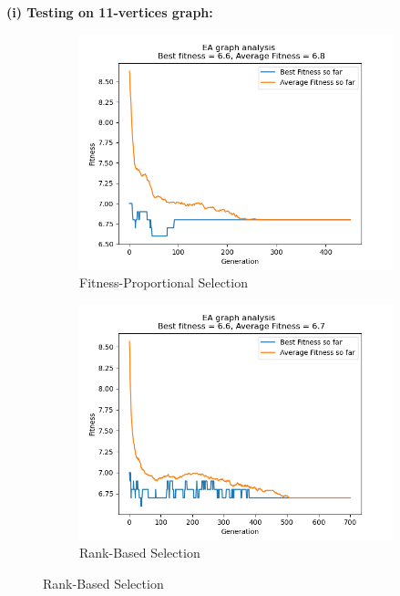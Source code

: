 \documentclass[conference,compsoc]{IEEEtran}
\begin{document}
\begin{center}
  \textbf{(i) Testing on 11-vertices graph:}
\end{center}
\setlength{\parskip}{0 em}
\begin{figure}[h]
  \vspace{-1 em}
  \centering 
  \begin{subfigure}{0.34\textwidth}
    \includegraphics[width=\linewidth]{../Results/_11_FPS_Truncation_100_50_450.png}
    \caption{Fitness-Proportional Selection}
  \end{subfigure}
  \begin{subfigure}{0.34\textwidth}
    \includegraphics[width=\linewidth]{../Results/_11_RBS_Truncation_100_50_700.png}
    \caption{Rank-Based Selection}

\end{subfigure}
\end{figure}
\end{document}
